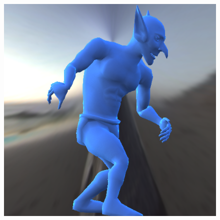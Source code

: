 \begin{figure}[H]
\endminipage\hfill
{}%
  \includegraphics[width=\linewidth]{./Imagens/brdfs/ashikhmin-shirley-alternative-goblin.png}
\endminipage
\end{figure}


